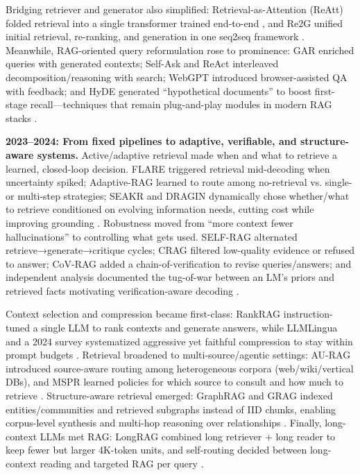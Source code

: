 Bridging retriever and generator also simplified: Retrieval-as-Attention (ReAtt) folded retrieval into a single transformer trained end-to-end \cite{reatt2022}, and Re2G unified initial retrieval, re-ranking, and generation in one seq2seq framework \cite{re2g2022}. Meanwhile, RAG-oriented query reformulation rose to prominence: GAR enriched queries with generated contexts; Self-Ask and ReAct interleaved decomposition/reasoning with search; WebGPT introduced browser-assisted QA with feedback; and HyDE generated ``hypothetical documents'' to boost first-stage recall---techniques that remain plug-and-play modules in modern RAG stacks \cite{gar2021, selfask2022, react2022, webgpt2021, hyde2022}.

\textbf{2023--2024: From fixed pipelines to adaptive, verifiable, and structure-aware systems.}
Active/adaptive retrieval made when and what to retrieve a learned, closed-loop decision. FLARE triggered retrieval mid-decoding when uncertainty spiked; Adaptive-RAG learned to route among no-retrieval vs. single- or multi-step strategies; SEAKR and DRAGIN dynamically chose whether/what to retrieve conditioned on evolving information needs, cutting cost while improving grounding \cite{flare2023, adaptive_rag2024, seakr2024, dragin2024}. Robustness moved from “more context fewer hallucinations” to controlling what gets used. SELF-RAG alternated retrieve→generate→critique cycles; CRAG filtered low-quality evidence or refused to answer; CoV-RAG added a chain-of-verification to revise queries/answers; and independent analysis documented the tug-of-war between an LM’s priors and retrieved facts motivating verification-aware decoding \cite{selfrag2023, crag2024, covrag2024, lmpriors2024}.

Context selection and compression became first-class: RankRAG instruction-tuned a single LLM to rank contexts and generate answers, while LLMLingua and a 2024 survey systematized aggressive yet faithful compression to stay within prompt budgets \cite{rankrag2024, llmlingua2023, compression2024}. Retrieval broadened to multi-source/agentic settings: AU-RAG introduced source-aware routing among heterogeneous corpora (web/wiki/vertical DBs), and MSPR learned policies for which source to consult and how much to retrieve \cite{au_rag2024, mspr2024}. Structure-aware retrieval emerged: GraphRAG and GRAG indexed entities/communities and retrieved subgraphs instead of IID chunks, enabling corpus-level synthesis and multi-hop reasoning over relationships \cite{graphrag2024, grag2024}. Finally, long-context LLMs met RAG: LongRAG combined long retriever + long reader to keep fewer but larger 4K-token units, and self-routing decided between long-context reading and targeted RAG per query \cite{longrag2024, selfroute2024}.

